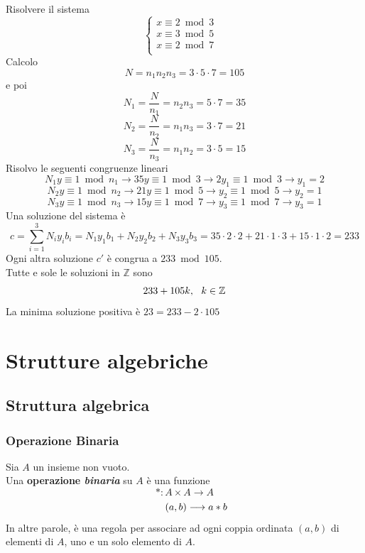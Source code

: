 \documentclass[a4paper,12pt, oneside]{book}
\begin{document}
\begin{shaded}
	\begin{esempio}
		Risolvere il sistema
		$$\begin{cases}
				x \equiv 2 \bmod 3   \\
				x \equiv 3 \bmod 5 & \\
				x \equiv 2 \bmod 7 & \\
			\end{cases}$$
		Calcolo $$N = n_1n_2n_3 = 3 \cdot 5 \cdot 7 = 105$$ e poi
		$$N_1=\frac{N}{n_1}=n_2n_3=5\cdot7=35$$
		$$N_2=\frac{N}{n_2}=n_1n_3=3\cdot7=21$$
		$$N_3=\frac{N}{n_3}=n_1n_2=3\cdot5=15$$
		Risolvo le seguenti congruenze lineari
		$$N_1y \equiv 1 \bmod n_1 \rightarrow 35y \equiv 1 \bmod 3 \rightarrow 2y_1 \equiv 1 \bmod 3 \longrightarrow y_1=2$$
		$$N_2y \equiv 1 \bmod n_2 \rightarrow 21y \equiv 1 \bmod 5 \rightarrow y_2  \equiv 1 \bmod 5 \longrightarrow y_2=1$$
		$$N_3y \equiv 1 \bmod n_3 \rightarrow 15y \equiv 1 \bmod 7 \rightarrow y_3  \equiv 1 \bmod 7 \longrightarrow y_3=1$$
		Una soluzione del sistema è
		$$c = \sum_{i=1}^{3} N_iy_ib_i = N_1y_1b_1 + N_2y_2b_2 + N_3y_3b_3 = 35 \cdot 2 \cdot 2 + 21 \cdot 1 \cdot 3 + 15 \cdot1 \cdot2 = 233$$
		Ogni altra soluzione $c'$ è congrua a $233 \bmod 105$.\\
		Tutte e sole le soluzioni in $\mathbb{Z}$ sono
		$$233+105k, \mbox{\space\space} k \in \mathbb{Z}$$
		La minima soluzione positiva è $23 = 233-2\cdot105$
	\end{esempio}
\end{shaded}

\chapter{Strutture algebriche}
\section{Struttura algebrica}
\subsection{Operazione Binaria}
\begin{definizione}
	Sia $A$ un insieme non vuoto.\\
	Una \textbf{operazione \textit{binaria}} su $A$ è una funzione
	$$* : A \times A \longrightarrow A$$
	$$\mbox{\space\space\space\space\space\space\space} (a,b) \longrightarrow a * b$$
	In altre parole, è una regola per associare ad ogni coppia ordinata $(a,b)$ di elementi di $A$, uno e un solo elemento di $A$.
\end{definizione}
\end{document}
